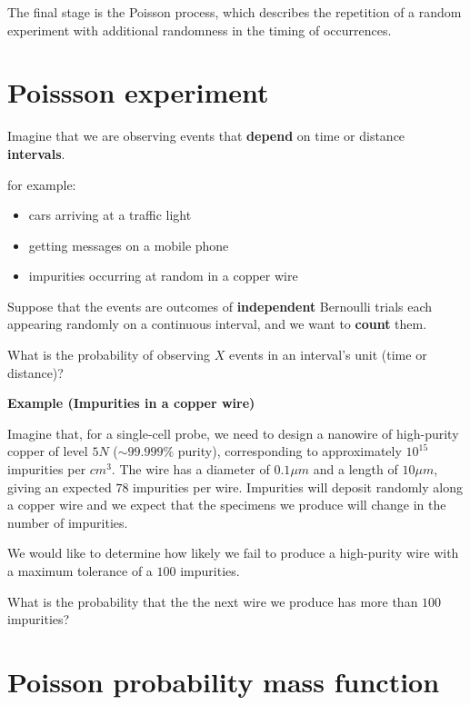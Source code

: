 \documentclass[
]{book}
\providecommand{\tightlist}{%
  \setlength{\itemsep}{0pt}\setlength{\parskip}{0pt}}
\begin{document}
The final stage is the Poisson process, which describes the repetition of a random experiment with additional randomness in the timing of occurrences.

\hypertarget{poissson-experiment}{%
\section{Poissson experiment}\label{poissson-experiment}}

Imagine that we are observing events that \textbf{depend} on time or distance \textbf{intervals}.

for example:

\begin{itemize}
\tightlist
\item
  cars arriving at a traffic light
\item
  getting messages on a mobile phone
\item
  impurities occurring at random in a copper wire
\end{itemize}

Suppose that the events are outcomes of \textbf{independent} Bernoulli trials each appearing randomly on a continuous interval, and we want to \textbf{count} them.

What is the probability of observing \(X\) events in an interval's unit (time or distance)?

\textbf{Example (Impurities in a copper wire)}

Imagine that, for a single-cell probe, we need to design a nanowire of high-purity copper of level \(5N\) (\(\sim 99.999\%\) purity), corresponding to approximately \(10^{15}\) impurities per \(cm^3\). The wire has a diameter of \(0.1\mu m\) and a length of \(10\mu m\), giving an expected \(78\) impurities per wire. Impurities will deposit randomly along a copper wire and we expect that the specimens we produce will change in the number of impurities.

We would like to determine how likely we fail to produce a high-purity wire with a maximum tolerance of a \(100\) impurities.

What is the probability that the the next wire we produce has more than \(100\) impurities?

\hypertarget{poisson-probability-mass-function}{%
\section{Poisson probability mass function}\label{poisson-probability-mass-function}}
\end{document}
